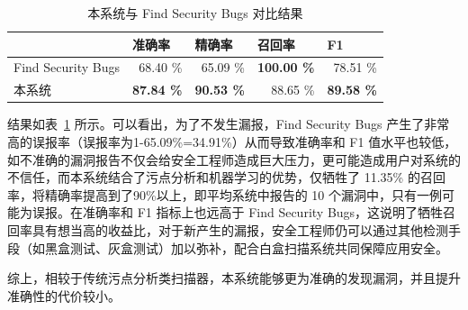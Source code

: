 \begin{table}[htbp]
    \centering
    \caption{本系统与 Find Security Bugs 对比结果}
    \begin{tabular}{lrrrr}
        \toprule
        & \multicolumn{1}{l}{准确率} & \multicolumn{1}{l}{精确率} & \multicolumn{1}{l}{召回率} & \multicolumn{1}{l}{F1} \\
        \midrule
        Find Security Bugs & 68.40 \% & 65.09 \% & \textbf{100.00 \%} & 78.51 \% \\
        本系统   & \textbf{87.84 \%} & \textbf{90.53 \%} & 88.65 \% & \textbf{89.58 \% }\\
        \bottomrule
    \end{tabular}%
    \label{tab:rq1}%
\end{table}%

结果如表~\ref{tab:rq1} 所示。可以看出，为了不发生漏报，Find Security Bugs 产生了非常高的误报率（误报率为1-65.09\%=34.91\%）从而导致准确率和 F1 值水平也较低，如不准确的漏洞报告不仅会给安全工程师造成巨大压力，更可能造成用户对系统的不信任，而本系统结合了污点分析和机器学习的优势，仅牺牲了 11.35\% 的召回率，将精确率提高到了90\%以上，即平均系统中报告的 10 个漏洞中，只有一例可能为误报。在准确率和 F1 指标上也远高于 Find Security Bugs，这说明了牺牲召回率具有想当高的收益比，对于新产生的漏报，安全工程师仍可以通过其他检测手段（如黑盒测试、灰盒测试）加以弥补，配合白盒扫描系统共同保障应用安全。

综上，相较于传统污点分析类扫描器，本系统能够更为准确的发现漏洞，并且提升准确性的代价较小。\\


%
%
%

